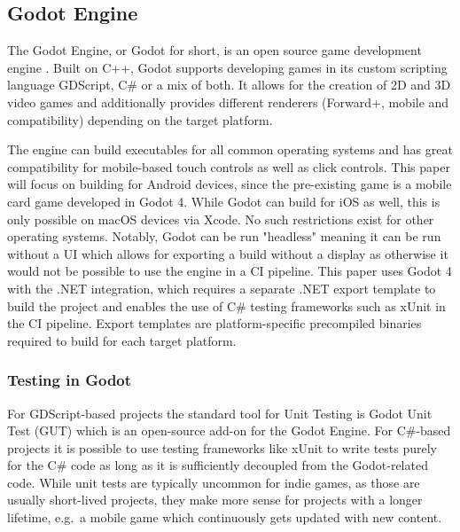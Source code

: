 \subsection{Godot Engine}
The Godot Engine, or Godot for short, is an open source game development engine \cite{b1}. Built on C++, Godot supports developing games in its custom scripting language GDScript, C\# or a mix of both. It allows for the creation of 2D and 3D video games and additionally provides different renderers (Forward+, mobile and compatibility) depending on the target platform.

The engine can build executables for all common operating systems and has great compatibility for mobile-based touch controls as well as click controls. This paper will focus on building for Android devices, since the pre-existing game is a mobile card game developed in Godot 4. While Godot can build for iOS as well, this is only possible on macOS devices via Xcode. No such restrictions exist for other operating systems. Notably, Godot can be run "headless" meaning it can be run without a UI which allows for exporting a build without a display as otherwise it would not be possible to use the engine in a CI pipeline. This paper uses Godot 4 with the .NET integration, which requires a separate .NET export template to build the project and enables the use of C\# testing frameworks such as xUnit in the CI pipeline. Export templates are platform-specific precompiled binaries required to build for each target platform.

\subsubsection{Testing in Godot}

For GDScript-based projects the standard tool for Unit Testing is Godot Unit Test (GUT) \cite{b2} which is an open-source add-on for the Godot Engine. For C\#-based projects it is possible to use testing frameworks like xUnit to write tests purely for the C\# code as long as it is sufficiently decoupled from the Godot-related code. While unit tests are typically uncommon for indie games, as those are usually short-lived projects, they make more sense for projects with a longer lifetime, e.g.\ a mobile game which continuously gets updated with new content.